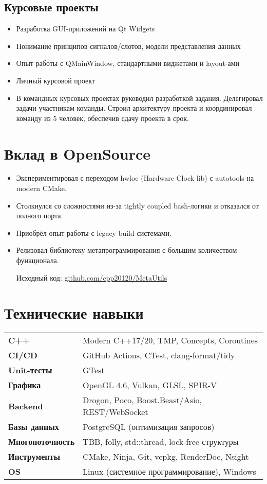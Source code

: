 \documentclass[a4paper,10pt]{article}
\begin{document}
	\subsection*{Курсовые проекты}
	\begin{itemize}[noitemsep]
		\item Разработка GUI-приложений на Qt Widgets
		\item Понимание принципов сигналов/слотов, модели представления данных
		\item Опыт работы с QMainWindow, стандартными виджетами и layout-ами
        \item Личный курсовой проект
	\end{itemize}
    \begin{itemize}
        \item В командных курсовых проектах руководил разработкой задания. Делегировал задачи участникам команды. Строил архитектуру проекта и координировал команду из 5 человек, обеспечив сдачу проекта в срок.
    \end{itemize}
	
	\section*{Вклад в OpenSource}
	\begin{itemize}[noitemsep]
		\item Экспериментировал с переходом hwloc (Hardware Clock lib) с autotools на modern CMake.  
		\item Столкнулся со сложностями из-за tightly coupled bash-логики и отказался от полного порта.  
		\item Приобрёл опыт работы с legacy build-системами.  
		\item Релизовал библиотеку метапрограммирования с большим количеством функционала. 
        
        Исходный код: \href{https://github.com/cpp20120/MetaUtils}{github.com/cpp20120/MetaUtils}
	\end{itemize}
	
	\section*{Технические навыки}
	\begin{tabular}{@{}ll@{}}
		\textbf{C++} & Modern C++17/20, TMP, Concepts, Coroutines \\
		\textbf{CI/CD} & GitHub Actions, CTest, clang-format/tidy \\
		\textbf{Unit-тесты} & GTest \\
		\textbf{Графика } & OpenGL 4.6, Vulkan, GLSL, SPIR-V \\
		\textbf{Backend} & Drogon, Poco, Boost.Beast/Asio, REST/WebSocket \\
		\textbf{Базы данных} & PostgreSQL (оптимизация запросов) \\
		\textbf{Многопоточность} & TBB, folly, std::thread, lock-free структуры \\
		\textbf{Инструменты} & CMake, Ninja, Git, vcpkg, RenderDoc, Nsight \\
		\textbf{OS} & Linux (системное программирование), Windows \\
	\end{tabular}
	
\end{document}

